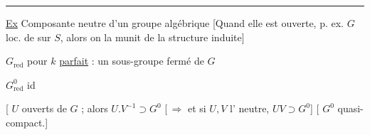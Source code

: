 \par\noindent\rule{.94\linewidth}{.4pt}\par
\uline{Ex} Composante neutre  d'un groupe algébrique \deleted{[elle est quasi-compacte} [Quand elle est ouverte, p. ex. $G$ loc. de  sur $S$, alors on la munit de la structure induite]

$G_{\mathrm{red}}$ pour $k$ \uline{parfait} : un sous-groupe fermé de $G$

$G^{0}_{\mathrm{red}}$ id

[ $U$   ouverts de $G$ ; alors $U.V^{-1}\supset G^0$ [\,$\Rightarrow$ et si $U,V$  l' neutre, $UV\supset G^0$] [ $G^0$ quasi-compact.]

